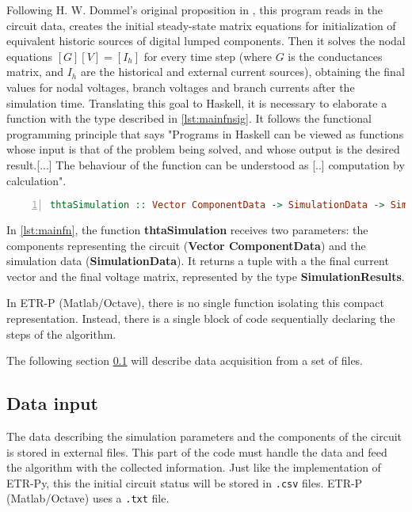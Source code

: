 Following H. W. Dommel's original proposition in \cite{dommel1969digital}, this program reads in the circuit data, creates the initial steady-state matrix equations for initialization of equivalent historic sources of digital lumped components. Then it solves the nodal equations $ [G] [V] = [I_h] $ for every time step (where $ G $ is the conductances matrix, and $ I_h $ are the historical and external current sources), obtaining the final values for nodal voltages, branch voltages and branch currents after the simulation time. Translating this goal to Haskell, it is necessary to elaborate a function with the type described in \cref{lst:mainfnsig}. It follows the functional programming principle that says "Programs in Haskell can be viewed as functions whose input is that of the problem being solved, and whose output is the desired result.[...] The behaviour of the function can be understood as [..] computation by calculation". \cite{hudak2000haskell}

\begin{lstlisting}[language=Haskell, numbers=left, caption={ETR-P Haskell goal's function}, captionpos=b, label={lst:mainfnsig}]
thtaSimulation :: Vector ComponentData -> SimulationData -> SimulationResults
\end{lstlisting}

In \cref{lst:mainfn}, the function \textbf{thtaSimulation} receives two parameters: the components representing the circuit (\textbf{Vector ComponentData}) and the simulation data (\textbf{SimulationData}). It returns a tuple with a the final current vector and the final voltage matrix, represented by the type \textbf{SimulationResults}.

In ETR-P (Matlab/Octave), there is no single function isolating this compact representation. Instead, there is a single block of code sequentially declaring the steps of the algorithm.

The following section \ref{haskellimpl} will describe data acquisition from a set of files.

\subsection{ Data input }
\label{haskellimpl}

The data describing the simulation parameters and the components of the circuit is stored in external files. This part of the code must handle the data and feed the algorithm with the collected information.  Just like the implementation of ETR-Py, this the initial circuit status will be stored in \lstinline!.csv! files. ETR-P (Matlab/Octave) uses a \lstinline!.txt! file.  

